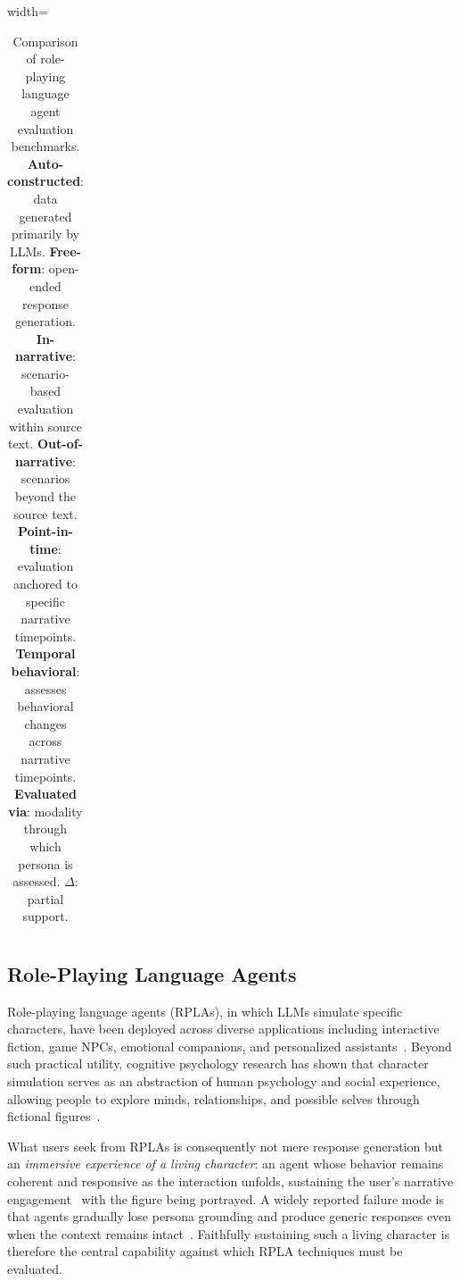 \documentclass{llmxive}
\begin{document}
{\begin{table}[t!]
\begin{adjustbox}{width=\textwidth}
\begin{tabular}{lcccccccl}
\end{tabular}
\end{adjustbox}
\caption{
Comparison of role-playing language agent evaluation benchmarks.
\textbf{Auto-constructed}: data generated primarily by LLMs.
\textbf{Free-form}: open-ended response generation.
\textbf{In-narrative}: scenario-based evaluation within source text.
\textbf{Out-of-narrative}: scenarios beyond the source text.
\textbf{Point-in-time}: evaluation anchored to specific narrative timepoints.
\textbf{Temporal behavioral}: assesses behavioral changes across narrative timepoints.
\textbf{Evaluated via}: modality through which persona is assessed.
$\Delta$: partial support.
}
\label{tab:benchmark_comparison}
\end{table}
}



\subsection{Role-Playing Language Agents\label{sec:character_psychology}}

Role-playing language agents (RPLAs), in which LLMs simulate specific characters, have been deployed across diverse applications including interactive fiction, game NPCs, emotional companions, and personalized assistants~\cite{chen2024personatoper, wang-etal-2024-rolellm, gao-etal-2023-livechat, Xu_2022_COSPLAY, shanahan2023roleplaylargelanguagemodels, chen2025oscarsaitheatersurvey}. Beyond such practical utility, cognitive psychology research has shown that character simulation serves as an abstraction of human psychology and social experience, allowing people to explore minds, relationships, and possible selves through fictional figures~\cite{functionoffiction, OATLEY2016618fictionsocialworlds}.

What users seek from RPLAs is consequently not mere response generation but an \emph{immersive experience of a living character}: an agent whose behavior remains coherent and responsive as the interaction unfolds, sustaining the user's narrative engagement~\cite{green2000, Ryan:2003:Book, Ryan:2008:ICIDS, Busselle23112009} with the figure being portrayed. A widely reported failure mode is that agents gradually lose persona grounding and produce generic responses even when the context remains intact~\cite{shin-etal-2025-spotting, luz-de-araujo-etal-2026-persistent}. Faithfully sustaining such a living character is therefore the central capability against which RPLA techniques must be evaluated.
\end{document}
